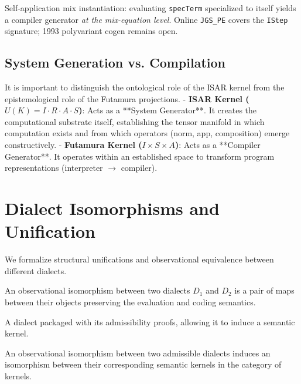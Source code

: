 \begin{theorem}
Self-application mix instantiation: evaluating \texttt{specTerm} specialized to itself yields a compiler generator \emph{at the mix-equation level}. Online \texttt{JGS\_PE} covers the \texttt{IStep} signature; 1993 polyvariant cogen remains open.
\end{theorem}

\subsection{System Generation vs. Compilation}
It is important to distinguish the ontological role of the ISAR kernel from the epistemological role of the Futamura projections.
- \textbf{ISAR Kernel ($U(K) = I \cdot R \cdot A \cdot S$)}: Acts as a **System Generator**. It creates the computational substrate itself, establishing the tensor manifold in which computation exists and from which operators (norm, app, composition) emerge constructively.
- \textbf{Futamura Kernel ($I \times S \times A$)}: Acts as a **Compiler Generator**. It operates within an established space to transform program representations (interpreter $\to$ compiler).

\section{Dialect Isomorphisms and Unification}

We formalize structural unifications and observational equivalence between different dialects.

\begin{definition}
An observational isomorphism between two dialects $D_1$ and $D_2$ is a pair of maps between their objects preserving the evaluation and coding semantics.
\end{definition}

\begin{definition}
A dialect packaged with its admissibility proofs, allowing it to induce a semantic kernel.
\end{definition}

\begin{theorem}
An observational isomorphism between two admissible dialects induces an isomorphism between their corresponding semantic kernels in the category of kernels.
\end{theorem}


